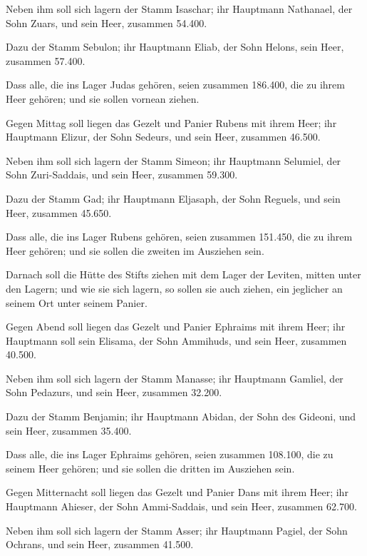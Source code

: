 Neben ihm soll sich lagern der Stamm Isaschar; ihr
Hauptmann Nathanael, der Sohn Zuars,  und sein Heer,
zusammen 54.400.

 Dazu der Stamm Sebulon; ihr Hauptmann Eliab, der Sohn
Helons,  sein Heer, zusammen 57.400.

 Dass alle, die ins Lager Judas gehören, seien zusammen
186.400, die zu ihrem Heer gehören; und sie sollen vornean ziehen.

 Gegen Mittag soll liegen das Gezelt und Panier Rubens
mit ihrem Heer; ihr Hauptmann Elizur, der Sohn Sedeurs, 
und sein Heer, zusammen 46.500.

 Neben ihm soll sich lagern der Stamm Simeon; ihr
Hauptmann Selumiel, der Sohn Zuri-Saddais,  und sein
Heer, zusammen 59.300.

 Dazu der Stamm Gad; ihr Hauptmann Eljasaph, der Sohn
Reguels,  und sein Heer, zusammen 45.650.

 Dass alle, die ins Lager Rubens gehören, seien zusammen
151.450, die zu ihrem Heer gehören; und sie sollen die zweiten im
Ausziehen sein.

 Darnach soll die Hütte des Stifts ziehen mit dem Lager
der Leviten, mitten unter den Lagern; und wie sie sich lagern, so sollen
sie auch ziehen, ein jeglicher an seinem Ort unter seinem Panier.

 Gegen Abend soll liegen das Gezelt und Panier Ephraims
mit ihrem Heer; ihr Hauptmann soll sein Elisama, der Sohn Ammihuds,
 und sein Heer, zusammen 40.500.

 Neben ihm soll sich lagern der Stamm Manasse; ihr
Hauptmann Gamliel, der Sohn Pedazurs,  und sein Heer,
zusammen 32.200.

 Dazu der Stamm Benjamin; ihr Hauptmann Abidan, der Sohn
des Gideoni,  und sein Heer, zusammen 35.400.

 Dass alle, die ins Lager Ephraims gehören, seien
zusammen 108.100, die zu seinem Heer gehören; und sie sollen die dritten
im Ausziehen sein.

 Gegen Mitternacht soll liegen das Gezelt und Panier Dans
mit ihrem Heer; ihr Hauptmann Ahieser, der Sohn Ammi-Saddais,
 und sein Heer, zusammen 62.700.

 Neben ihm soll sich lagern der Stamm Asser; ihr
Hauptmann Pagiel, der Sohn Ochrans,  und sein Heer,
zusammen 41.500.

